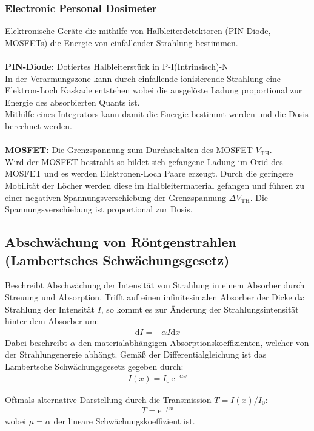 \documentclass[11pt, a4paper]{article}
\numberwithin{equation}{section}
\begin{document}
\subsubsection{Electronic Personal Dosimeter}
Elektronische Geräte die mithilfe von Halbleiterdetektoren (PIN-Diode, MOSFETs) die Energie von einfallender Strahlung bestimmen.\\
\\
\textbf{PIN-Diode:} Dotiertes Halbleiterstück in P-I(Intrinsisch)-N\\
In der Verarmungszone kann durch einfallende ionisierende Strahlung eine Elektron-Loch Kaskade entstehen wobei die ausgelöste Ladung proportional zur Energie des absorbierten Quants ist.\\
Mithilfe eines Integrators kann damit die Energie bestimmt werden und die Dosis berechnet werden.\\
\\
\textbf{MOSFET:} Die Grenzspannung zum Durchschalten des MOSFET $V_\mathrm{TH}$.\\
Wird der MOSFET bestrahlt so bildet sich gefangene Ladung im Oxid des MOSFET und es werden Elektronen-Loch Paare erzeugt.
Durch die geringere Mobilität der Löcher werden diese im Halbleitermaterial gefangen und führen zu einer negativen Spannungsverschiebung der Grenzspannung $\Delta V_\mathrm{TH}$.
Die Spannungsverschiebung ist proportional zur Dosis.


\subsection{Abschwächung von Röntgenstrahlen (Lambertsches Schwächungsgesetz)}
Beschreibt Abschwächung der Intensität von Strahlung in einem Absorber durch Streuung und Absorption.
Trifft auf einen infinitesimalen Absorber der Dicke $\mathrm{d} x$ Strahlung der Intensität $I$, so kommt es zur Änderung der Strahlungsintensität hinter dem Absorber um:
\begin{align}
	\mathrm{d} I = - \alpha I \mathrm{d} x
\end{align}
Dabei beschreibt $\alpha$ den materialabhängigen Absorptionskoeffizienten, welcher von der Strahlungenergie abhängt.
Gemäß der Differentialgleichung ist das Lambertsche Schwächungsgesetz gegeben durch:
\begin{align}
	I(x) = I_0 \, \mathrm{e}^{-\alpha x}
	\label{eq:schwächung}
\end{align}

Oftmals alternative Darstellung durch die Transmission $T = I(x)/I_0$:
\begin{align}
	T = \mathrm{e}^{-\mu x}
\end{align}
wobei $\mu = \alpha$ der lineare Schwächungskoeffizient ist.
\end{document}
